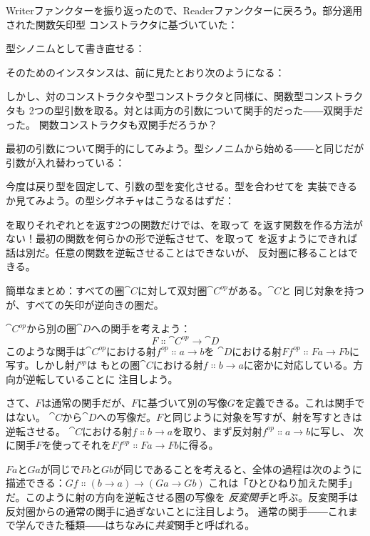 Writerファンクターを振り返ったので、Readerファンクターに戻ろう。部分適用された関数矢印型
コンストラクタに基づいていた：

型シノニムとして書き直せる：

そのためのインスタンスは、前に見たとおり次のようになる：

しかし、対のコンストラクタや型コンストラクタと同様に、関数型コンストラクタも
2つの型引数を取る。対とは両方の引数について関手的だった――双関手だった。
関数コンストラクタも双関手だろうか？

最初の引数について関手的にしてみよう。型シノニムから始める――と同じだが
引数が入れ替わっている：

今度は戻り型を固定して、引数の型を変化させる。型を合わせてを
実装できるか見てみよう。の型シグネチャはこうなるはずだ：

を取りそれぞれとを返す2つの関数だけでは、を取って
を返す関数を作る方法がない！最初の関数を何らかの形で逆転させて、を取って
を返すようにできれば話は別だ。任意の関数を逆転させることはできないが、
反対圏に移ることはできる。

簡単なまとめ：すべての圏$\cat{C}$に対して双対圏$\cat{C}^\mathit{op}$がある。$\cat{C}$と
同じ対象を持つが、すべての矢印が逆向きの圏だ。

$\cat{C}^\mathit{op}$から別の圏$\cat{D}$への関手を考えよう：
\[F \Colon \cat{C}^\mathit{op} \to \cat{D}\]
このような関手は$\cat{C}^\mathit{op}$における射$f^\mathit{op} \Colon a \to b$を
$\cat{D}$における射$F f^\mathit{op} \Colon F a \to F b$に写す。しかし射$f^\mathit{op}$は
もとの圏$\cat{C}$における射$f \Colon b \to a$に密かに対応している。方向が逆転していることに
注目しよう。

さて、$F$は通常の関手だが、$F$に基づいて別の写像$G$を定義できる。これは関手ではない。
$\cat{C}$から$\cat{D}$への写像だ。$F$と同じように対象を写すが、射を写すときは逆転させる。
$\cat{C}$における射$f \Colon b \to a$を取り、まず反対射$f^\mathit{op} \Colon a \to b$に写し、
次に関手$F$を使ってそれを$F f^\mathit{op} \Colon F a \to F b$に得る。

$F a$と$G a$が同じで$F b$と$G b$が同じであることを考えると、全体の過程は次のように
描述できる：$G f \Colon (b \to a) \to (G a \to G b)$
これは「ひとひねり加えた関手」だ。このように射の方向を逆転させる圏の写像を
\emph{反変関手}と呼ぶ。反変関手は反対圏からの通常の関手に過ぎないことに注目しよう。
通常の関手――これまで学んできた種類――はちなみに\emph{共変}関手と呼ばれる。

